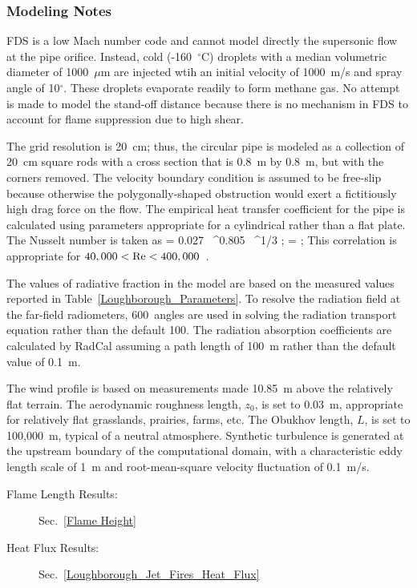 \subsubsection{Modeling Notes}

FDS is a low Mach number code and cannot model directly the supersonic flow at the pipe orifice. Instead, cold (-160~$^\circ$C) droplets with a median volumetric diameter of 1000~$\mu$m are injected wtih an initial velocity of 1000~m/s and spray angle of 10$^\circ$. These droplets evaporate readily to form methane gas. No attempt is made to model the stand-off distance because there is no mechanism in FDS to account for flame suppression due to high shear.

The grid resolution is 20~cm; thus, the circular pipe is modeled as a collection of 20~cm square rods with a cross section that is 0.8~m by 0.8~m, but with the corners removed. The velocity boundary condition is assumed to be free-slip because otherwise the polygonally-shaped obstruction would exert a fictitiously high drag force on the flow. The empirical heat transfer coefficient for the pipe is calculated using parameters appropriate for a cylindrical rather than a flat plate. The Nusselt number is taken as 
\be
   \NU = 0.027 \, \RE^{0.805} \, \PR^{1/3} \quad ; \quad \RE =  \quad ; \quad {}
\ee
This correlation is appropriate for $40,000 < \hbox{Re} < 400,000$~\cite{Incropera:1}.

The values of radiative fraction in the model are based on the measured values reported in Table~\ref{Loughborough_Parameters}. To resolve the radiation field at the far-field radiometers, 600~angles are used in solving the radiation transport equation rather than the default 100. The radiation absorption coefficients are calculated by RadCal assuming a path length of 100~m rather than the default value of 0.1~m. 

The wind profile is based on measurements made 10.85~m above the relatively flat terrain. The aerodynamic roughness length, $z_0$, is set to 0.03~m, appropriate for relatively flat grasslands, prairies, farms, etc. The Obukhov length, $L$, is set to 100,000~m, typical of a neutral atmosphere. Synthetic turbulence is generated at the upstream boundary of the computational domain, with a characteristic eddy length scale of 1~m and root-mean-square velocity fluctuation of 0.1~m/s.

\begin{description}
\item[Flame Length Results:] Sec.~\ref{Flame Height}
\item[Heat Flux Results:] Sec.~\ref{Loughborough_Jet_Fires_Heat_Flux}
\end{description}


